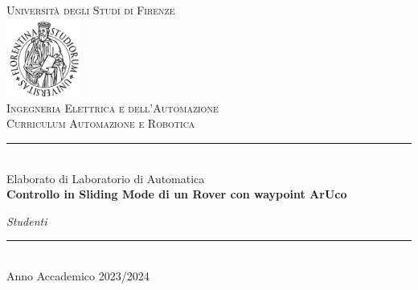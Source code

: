 \begin{titlepage}
    \begin{center}
        \textsc{\Large Universit\`a degli Studi di Firenze}\medskip
	    \\ [1.0cm]
		\includegraphics[width=25mm]{img/stemma}\\[.5cm]
		 \textsc{ Ingegneria Elettrica e dell'Automazione \\ Curriculum Automazione e Robotica}\medskip\\
		 \rule{50mm}{0.01mm}\medskip\\
		Elaborato di Laboratorio di Automatica \medskip\\
    \LARGE \textbf{ Controllo in Sliding Mode di un Rover con waypoint ArUco } 
    \normalsize  \vspace*{5\baselineskip}
    \medskip\\
       
         \end{center}
          \makeatletter
    \begin{minipage}[t]{65mm}
   \raggedright
   {\it Studenti}\newline
    \@author
   \end{minipage}%
		\makeatother
		
   \vfill
  \begin{center}
    \rule{40mm}{0.01mm}\\
    {Anno Accademico 2023/2024}
  \end{center}
\end{titlepage} 
